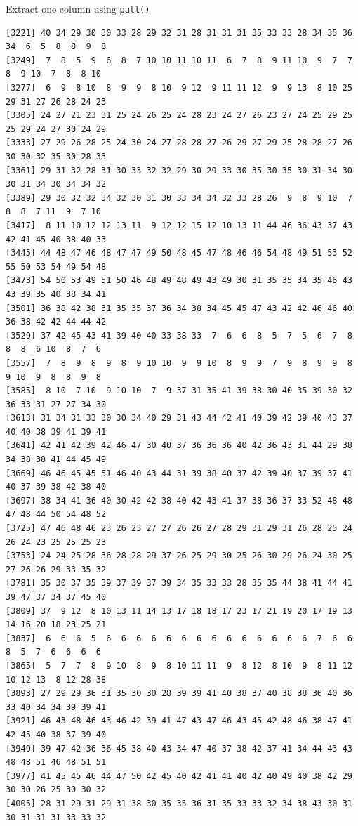 \documentclass[
  ignorenonframetext,
  aspectratio=169,
]{beamer}
\let\oldtexttt\texttt
\renewcommand{\texttt}[1]{\colorbox{gray!20}{\oldtexttt{#1}}}
\begin{document}
\begin{frame}[fragile]{Extract one column using \texttt{pull()}}
\begin{verbatim}
[3221] 40 34 29 30 30 33 28 29 32 31 28 31 31 31 35 33 33 28 34 35 36 34  6  5  8  8  9  8
[3249]  7  8  5  9  6  8  7 10 10 11 10 11  6  7  8  9 11 10  9  7  7  8  9 10  7  8  8 10
[3277]  6  9  8 10  8  9  9  8 10  9 12  9 11 11 12  9  9 13  8 10 25 29 31 27 26 28 24 23
[3305] 24 27 21 23 31 25 24 26 25 24 28 23 24 27 26 23 27 24 25 29 25 25 29 24 27 30 24 29
[3333] 27 29 26 28 25 24 30 24 27 28 28 27 26 29 27 29 25 28 28 27 26 30 30 32 35 30 28 33
[3361] 29 31 32 28 31 30 33 32 32 29 30 29 33 30 35 30 35 30 31 34 30 30 31 34 30 34 34 32
[3389] 29 30 32 32 34 32 30 31 30 33 34 34 32 33 28 26  9  8  9 10  7  8  8  7 11  9  7 10
[3417]  8 11 10 12 12 13 11  9 12 12 15 12 10 13 11 44 46 36 43 37 43 42 41 45 40 38 40 33
[3445] 44 48 47 46 48 47 47 49 50 48 45 47 48 46 46 54 48 49 51 53 52 55 50 53 54 49 54 48
[3473] 54 50 53 49 51 50 46 48 49 48 49 43 49 30 31 35 35 34 35 46 43 43 39 35 40 38 34 41
[3501] 36 38 42 38 31 35 35 37 36 34 38 34 45 45 47 43 42 42 46 46 40 36 38 42 42 44 44 42
[3529] 37 42 45 43 41 39 40 40 33 38 33  7  6  6  8  5  7  5  6  7  8  8  8  6 10  8  7  6
[3557]  7  8  9  8  9  8  9 10 10  9  9 10  8  9  9  7  9  8  9  9  8  9 10  9  8  8  9  8
[3585]  8 10  7 10  9 10 10  7  9 37 31 35 41 39 38 30 40 35 39 30 32 36 33 31 27 27 34 30
[3613] 31 34 31 33 30 30 34 40 29 31 43 44 42 41 40 39 42 39 40 43 37 40 40 38 39 41 39 41
[3641] 42 41 42 39 42 46 47 30 40 37 36 36 36 40 42 36 43 31 44 29 38 34 38 38 41 44 45 49
[3669] 46 46 45 45 51 46 40 43 44 31 39 38 40 37 42 39 40 37 39 37 41 40 37 39 38 42 38 40
[3697] 38 34 41 36 40 30 42 42 38 40 42 43 41 37 38 36 37 33 52 48 48 47 48 44 50 54 48 52
[3725] 47 46 48 46 23 26 23 27 27 26 26 27 28 29 31 29 31 26 28 25 24 26 24 23 25 25 25 23
[3753] 24 24 25 28 36 28 28 29 37 26 25 29 30 25 26 30 29 26 24 30 25 27 26 26 29 33 35 32
[3781] 35 30 37 35 39 37 39 37 39 34 35 33 33 28 35 35 44 38 41 44 41 39 47 37 34 37 45 40
[3809] 37  9 12  8 10 13 11 14 13 17 18 18 17 23 17 21 19 20 17 19 13 14 16 20 18 23 25 21
[3837]  6  6  6  5  6  6  6  6  6  6  6  6  6  6  6  6  6  6  7  6  6  8  5  7  6  6  6  6
[3865]  5  7  7  8  9 10  8  9  8 10 11 11  9  8 12  8 10  9  8 11 12 10 12 13  8 12 28 38
[3893] 27 29 29 36 31 35 30 30 28 39 39 41 40 38 37 40 38 38 36 40 36 33 40 34 34 39 39 41
[3921] 46 43 48 46 43 46 42 39 41 47 43 47 46 43 45 42 48 46 38 47 41 42 45 40 38 37 39 40
[3949] 39 47 42 36 36 45 38 40 43 34 47 40 37 38 42 37 41 34 44 43 43 48 48 51 46 48 51 51
[3977] 41 45 45 46 44 47 50 42 45 40 42 41 41 40 42 40 49 40 38 42 29 30 30 26 25 30 30 32
[4005] 28 31 29 31 29 31 38 30 35 35 36 31 35 33 33 32 34 38 43 30 31 30 31 31 31 33 33 32

\end{verbatim}
\end{frame}
\end{document}
